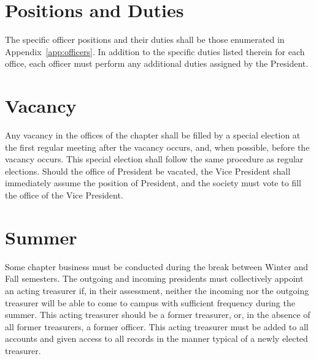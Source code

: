 \section{Positions and Duties}
The specific officer positions and their duties shall be those enumerated in Appendix~\ref{app:officers}. In addition to the specific duties listed therein for each office, each officer must perform any additional duties assigned by the President.

\section{Vacancy}
Any vacancy in the offices of the chapter shall be filled by a special election at the first regular meeting after the vacancy occurs, and, when possible, before the vacancy occurs. This special election shall follow the same procedure as regular elections. Should the office of President be vacated, the Vice President shall immediately assume the position of President, and the society must vote to fill the office of the Vice President.

\section{Summer}
Some chapter business must be conducted during the break between Winter and Fall semesters. The outgoing and incoming presidents must collectively appoint an acting treasurer if, in their assessment, neither the incoming nor the outgoing treasurer will be able to come to campus with sufficient frequency during the summer. This acting treasurer should be a former treasurer, or, in the absence of all former treasurers, a former officer. This acting treasurer must be added to all accounts and given access to all records in the manner typical of a newly elected treasurer.
